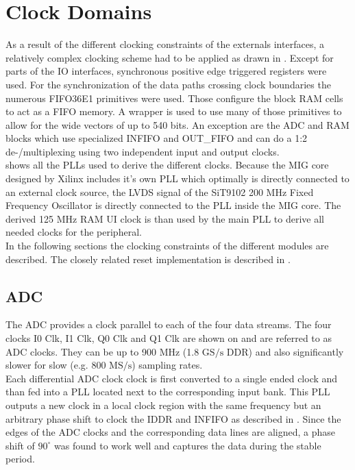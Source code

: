 \section{Clock Domains}
\label{sec:fpga_clocks}

As a result of the different clocking constraints of the externals interfaces,
a relatively complex clocking scheme had to be applied as drawn in
. Except for parts of the \gls{IO} interfaces,
synchronous positive edge triggered registers were used. For the synchronization
of the data paths crossing clock boundaries the numerous FIFO36E1 primitives
were used. Those configure the block \gls{RAM} cells to act as a \gls{FIFO}
memory. A wrapper is used to use many of those primitives to allow for the
wide vectors of up to 540 bits.
An exception are the \gls{ADC} and \gls{RAM} blocks which use
specialized \gls{INFIFO} and OUT\_FIFO and can do a 1:2 de-/multiplexing
using two independent input and output clocks. \\

 shows all the \glspl{PLL} used to derive the
different clocks. Because the \gls{MIG} core designed by Xilinx includes
it's own \gls{PLL} which optimally is directly connected to an external
clock source, the \gls{LVDS} signal of the SiT9102 200 MHz Fixed Frequency
Oscillator is directly connected to the \gls{PLL} inside the \gls{MIG} core.
The derived 125 MHz \gls{RAM} \gls{UI} clock is than used by the main
\gls{PLL} to derive all needed clocks for the peripheral. \\

In the following sections the clocking constraints of the different modules
are described. The closely related reset implementation is described
in . \\

\subsection{\gls{ADC}}
The \gls{ADC} provides a clock parallel to each of the four data streams.
The four clocks I0 Clk, I1 Clk, Q0 Clk and Q1 Clk are shown on
 and are referred to as \gls{ADC} clocks.
They can be up to 900 MHz (1.8 $\text{GS}/\text{s}$ \gls{DDR})
and also significantly slower for slow (e.g. 800 $\text{MS}/\text{s}$)
sampling rates. \\

Each differential \gls{ADC} clock clock is first converted to a single ended
clock and than fed into a \gls{PLL} located next to the corresponding input
bank. This \gls{PLL} outputs a new clock in a local clock region
with the same frequency but an arbitrary phase shift
to clock the \gls{IDDR} and \gls{INFIFO} as described in .
Since the edges of the \gls{ADC} clocks and the corresponding data lines
are aligned, a phase shift of $90^\circ$ was found to work well and captures
the data during the stable period. \\

